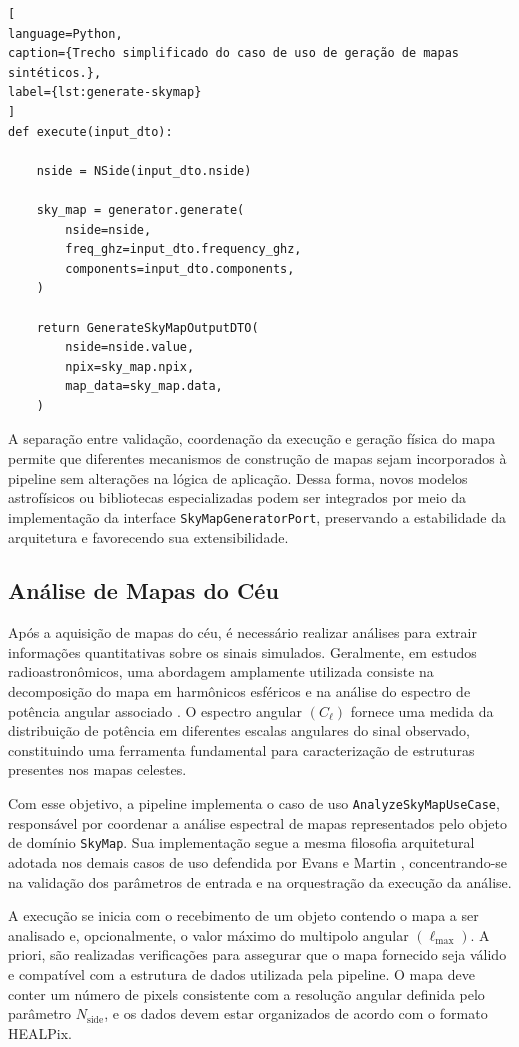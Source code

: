 \begin{lstlisting}[
language=Python,
caption={Trecho simplificado do caso de uso de geração de mapas sintéticos.},
label={lst:generate-skymap}
]
def execute(input_dto):

    nside = NSide(input_dto.nside)

    sky_map = generator.generate(
        nside=nside,
        freq_ghz=input_dto.frequency_ghz,
        components=input_dto.components,
    )

    return GenerateSkyMapOutputDTO(
        nside=nside.value,
        npix=sky_map.npix,
        map_data=sky_map.data,
    )
\end{lstlisting}

A separação entre validação, coordenação da execução e geração física do mapa permite que diferentes mecanismos de construção de mapas sejam incorporados à pipeline sem alterações na lógica de aplicação. Dessa forma, novos modelos astrofísicos ou bibliotecas especializadas podem ser integrados por meio da implementação da interface \texttt{SkyMapGeneratorPort}, preservando a estabilidade da arquitetura e favorecendo sua extensibilidade.


\subsection{Análise de Mapas do Céu}

Após a aquisição de mapas do céu, é necessário realizar análises para extrair informações quantitativas sobre os sinais simulados. Geralmente, em estudos radioastronômicos, uma abordagem amplamente utilizada consiste na decomposição do mapa em harmônicos esféricos e na análise do espectro de potência angular associado \cite{gorski2005healpix}. O espectro angular $(C_\ell)$ fornece uma medida da distribuição de potência em diferentes escalas angulares do sinal observado, constituindo uma ferramenta fundamental para caracterização de estruturas presentes nos mapas celestes.

Com esse objetivo, a pipeline implementa o caso de uso \texttt{AnalyzeSkyMapUseCase}, responsável por coordenar a análise espectral de mapas representados pelo objeto de domínio \texttt{SkyMap}. Sua implementação segue a mesma filosofia arquitetural adotada nos demais casos de uso defendida por Evans \cite{evans2003ddd} e Martin \cite{martin2008cleancode}, concentrando-se na validação dos parâmetros de entrada e na orquestração da execução da análise.

A execução se inicia com o recebimento de um objeto contendo o mapa a ser analisado e, opcionalmente, o valor máximo do multipolo angular $(\ell_{\mathrm{max}})$. A priori, são realizadas verificações para assegurar que o mapa fornecido seja válido e compatível com a estrutura de dados utilizada pela pipeline. O mapa deve conter um número de pixels consistente com a resolução angular definida pelo parâmetro $N_{\mathrm{side}}$, e os dados devem estar organizados de acordo com o formato HEALPix.

